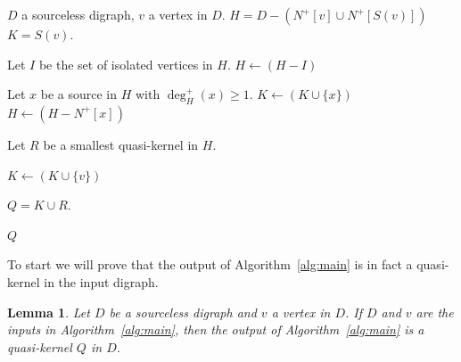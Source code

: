 \documentclass[12pt]{article}
\newtheorem{lemma}[theorem]{Lemma}
\theoremstyle{definition}
\begin{document}
\begin{algorithm}[H]
\caption{An algorithm for constructing a quasi-kernel.}
\label{alg:main}
\begin{algorithmic}
\Require $D$ a sourceless digraph, $v$ a vertex in $D$.
\State $H = D - (N^+{[v]} \cup N^+[S(v)])$
\State $K = S(v)$.



    \State Let $I$ be the set of isolated vertices in $H$.
    \State $H \gets (H - I)$

        \State Let $x$ be a source in $H$ with $\deg^+_H(x)\geq 1$.
        \State $K \gets (K \cup \{x\})$
        \State $H \gets (H -N^+[x])$
    \EndIf

\EndWhile

\State Let $R$ be a smallest quasi-kernel in $H$.


    \State $K \gets (K\cup\{v\})$
\EndIf


\State $Q = K \cup R$.

\State \Return $Q$

\end{algorithmic}
\end{algorithm}

To start we will prove that the output of Algorithm~\ref{alg:main} is in fact a quasi-kernel in the input digraph.

\begin{lemma}\label{Lemma: Alg works}
    Let $D$ be a sourceless digraph and $v$ a vertex in $D$.
    If $D$ and $v$ are the inputs in Algorithm~\ref{alg:main}, 
    then the output of Algorithm~\ref{alg:main} is a quasi-kernel $Q$ in $D$.
\end{lemma}
\end{document}

